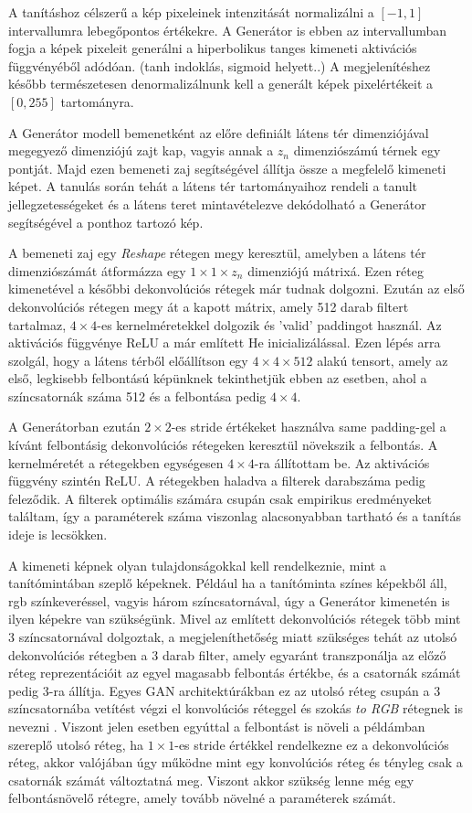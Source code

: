 A tanításhoz célszerű a kép pixeleinek intenzitását normalizálni a $[-1, 1]$ intervallumra lebegőpontos értékekre. A Generátor is ebben az intervallumban fogja a képek pixeleit generálni a hiperbolikus tanges kimeneti aktivációs függvényéből adódóan. (tanh indoklás, sigmoid helyett..) A megjelenítéshez később természetesen denormalizálnunk kell a generált képek pixelértékeit a $[0, 255]$ tartományra.

A Generátor modell bemenetként az előre definiált látens tér dimenziójával megegyező dimenziójú zajt kap, vagyis annak a $z_n$ dimenziószámú térnek egy pontját. Majd ezen bemeneti zaj segítségével állítja össze a megfelelő kimeneti képet. A tanulás során tehát a látens tér tartományaihoz rendeli a tanult jellegzetességeket és a látens teret mintavételezve dekódolható a Generátor segítségével a ponthoz tartozó kép.

A bemeneti zaj egy \textit{Reshape} rétegen megy keresztül, amelyben a látens tér dimenziószámát átformázza egy $1 \times 1 \times z_n$ dimenziójú mátrixá. Ezen réteg kimenetével a későbbi dekonvolúciós rétegek már tudnak dolgozni.
Ezután az első dekonvolúciós rétegen megy át a kapott mátrix, amely 512 darab filtert tartalmaz, $4 \times 4$-es kernelméretekkel dolgozik és 'valid' paddingot használ. Az aktivációs függvénye ReLU a már említett He inicializálással. Ezen lépés arra szolgál, hogy a látens térből előállítson egy $4 \times 4 \times 512$ alakú tensort, amely az első, legkisebb felbontású képünknek tekinthetjük ebben az esetben, ahol a színcsatornák száma 512 és a felbontása pedig $4 \times 4$.

A Generátorban ezután $2 \times 2$-es stride értékeket használva same padding-gel a kívánt felbontásig dekonvolúciós rétegeken keresztül növekszik a felbontás. A kernelméretét a rétegekben egységesen $4 \times 4$-ra állítottam be. Az aktivációs függvény szintén ReLU. A rétegekben haladva a filterek darabszáma pedig feleződik. A filterek optimális számára csupán csak empirikus eredményeket találtam, így a paraméterek száma viszonlag alacsonyabban tartható és a tanítás ideje is lecsökken.

A kimeneti képnek olyan tulajdonságokkal kell rendelkeznie, mint a tanítómintában szeplő képeknek. Például ha a tanítóminta színes képekből áll, rgb színkeveréssel, vagyis három színcsatornával, úgy a Generátor kimenetén is ilyen képekre van szükségünk. Mivel az említett dekonvolúciós rétegek több mint 3 színcsatornával dolgoztak, a megjeleníthetőség miatt szükséges tehát az utolsó dekonvolúciós rétegben a 3 darab filter, amely egyaránt transzponálja az előző réteg reprezentációit az egyel magasabb felbontás értékbe, és a csatornák számát pedig 3-ra állítja.
Egyes GAN architektúrákban ez az utolsó réteg csupán a 3 színcsatornába vetítést végzi el konvolúciós réteggel és szokás \textit{to RGB} rétegnek is nevezni \cite{karras2017progressive, karras2019style, karnewar2020msg}. Viszont jelen esetben egyúttal a felbontást is növeli a példámban szereplő utolsó réteg, ha $1 \times 1$-es stride értékkel rendelkezne ez a dekonvolúciós réteg, akkor valójában úgy működne mint egy konvolúciós réteg és tényleg csak a csatornák számát változtatná meg. Viszont akkor szükség lenne még egy felbontásnövelő rétegre, amely tovább növelné a paraméterek számát.

